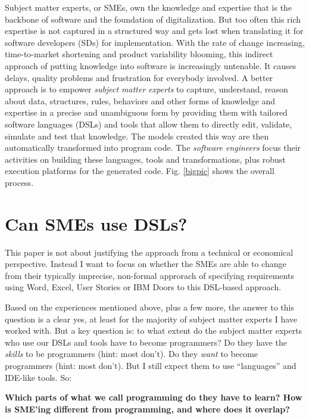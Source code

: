\documentclass[runningheads]{llncs}
\newcommand{\fig}[1]{Fig. \ref{#1}}  %
\begin{document}
Subject matter experts, or SMEs, own the knowledge and expertise that is the
backbone of software and the foundation of digitalization. But too often this
rich expertise is not captured in a structured way and gets lost when
translating it for software developers (SDs) for implementation. With the rate
of change increasing, time-to-market shortening and product variability
blooming, this indirect approach of putting knowledge into software is
increasingly untenable. It causes delays, quality problems and frustration for
everybody involved. A better approach is to empower \emph{subject matter
experts} to capture, understand, reason about data, structures, rules, behaviors
and other forms of knowledge and expertise in a precise and unambiguous form by
providing them with tailored software languages (DSLs) and tools that allow them
to directly edit, validate, simulate and test that knowledge. The models created
this way are then automatically transformed into program code. The
\emph{software engineers} focus their activities on building these languages,
tools and transformations, plus robust execution platforms for the generated
code. \fig{bigpic} shows the overall process.

\section{Can SMEs use DSLs?}

This paper is not about justifying the approach from a technical or economical
perspective. Instead I want to focus on whether the SMEs are able to change from
their typically imprecise, non-formal approrach of specifying requirements using
Word, Excel, User Stories or IBM Doors to this DSL-based approach. 

Based on the experiences mentioned above, plus a few more, the
answer to this question is a clear yes, at least for the majority
of subject matter experts I have worked with. But a key question is: to what
extent do the subject matter experts who use our DSLs and tools have to become
programmers? Do they have the \emph{skills} to be programmers (hint: most
don't). Do they \emph{want} to become programmers (hint: most don't). But I
still expect them to use ``languages'' and IDE-like tools. So:

\vspace{2mm}
\noindent \textbf{Which parts of what we call programming do they have to learn?
How is SME'ing different from programming, and where does it overlap?}
\vspace{2mm}
\end{document}
